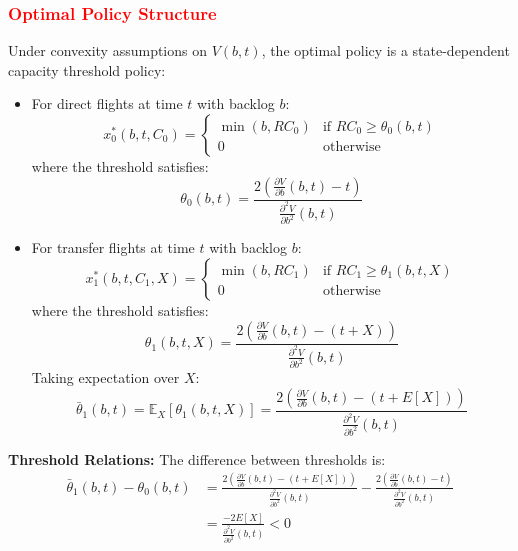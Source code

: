\documentclass[opre,sglanonrev]{informs4}
\begin{document}
\subsubsection{\textcolor{red}{Optimal Policy Structure}}

{\color{brown}
\begin{theorem}
\label{thm:stochastic_threshold_policy}
Under convexity assumptions on \( V(b, t) \), the optimal policy is a state-dependent capacity threshold policy:
\begin{itemize}
    \item For direct flights at time \( t \) with backlog \( b \):
    \[
    x_0^*(b, t, C_0) = \begin{cases}
    \min(b, R C_0) & \text{if } R C_0 \geq \theta_0(b, t) \\
    0 & \text{otherwise}
    \end{cases}
    \]
    where the threshold satisfies:
    \[
    \theta_0(b, t) = \frac{2 \left( \frac{\partial V}{\partial b}(b, t) - t \right)}{\frac{\partial^2 V}{\partial b^2}(b, t)}
    \]
    
    \item For transfer flights at time \( t \) with backlog \( b \):
    \[
    x_1^*(b, t, C_1, X) = \begin{cases}
    \min(b, R C_1) & \text{if } R C_1 \geq \theta_1(b, t, X) \\
    0 & \text{otherwise}
    \end{cases}
    \]
    where the threshold satisfies:
    \[
    \theta_1(b, t, X) = \frac{2 \left( \frac{\partial V}{\partial b}(b, t) - (t + X) \right)}{\frac{\partial^2 V}{\partial b^2}(b, t)}
    \]
    Taking expectation over \( X \):
    \[
    \bar{\theta}_1(b, t) = \mathbb{E}_X[\theta_1(b, t, X)] = \frac{2 \left( \frac{\partial V}{\partial b}(b, t) - (t + E[X]) \right)}{\frac{\partial^2 V}{\partial b^2}(b, t)}
    \]
\end{itemize}

\textbf{Threshold Relations:}
The difference between thresholds is:
\begin{align}
\bar{\theta}_1(b, t) - \theta_0(b, t) &= \frac{2 \left( \frac{\partial V}{\partial b}(b, t) - (t + E[X]) \right)}{\frac{\partial^2 V}{\partial b^2}(b, t)} - \frac{2 \left( \frac{\partial V}{\partial b}(b, t) - t \right)}{\frac{\partial^2 V}{\partial b^2}(b, t)} \nonumber \\
&= \frac{-2 E[X]}{\frac{\partial^2 V}{\partial b^2}(b, t)} < 0 \label{eq:threshold_relation}
\end{align}


\end{theorem}}
\end{document}
